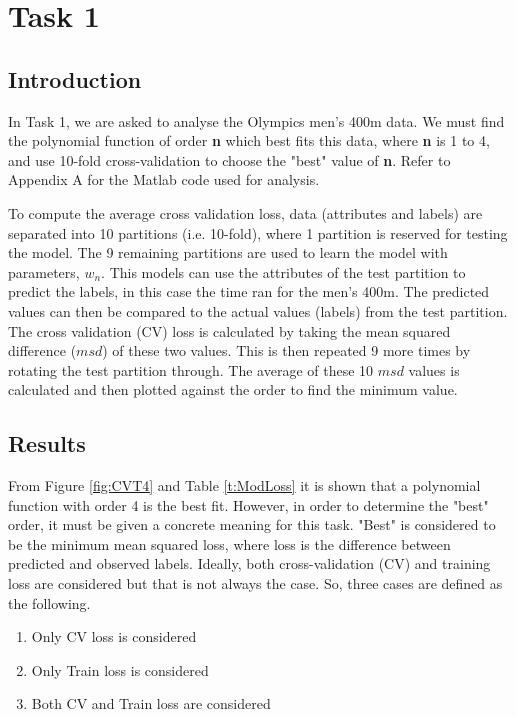 \section{Task 1}{\label{s1}
	
\subsection{Introduction}
In Task 1, we are asked to analyse the Olympics men's 400m data. We must find the polynomial function of order \textbf{n} which best fits this data, where \textbf{n} is 1 to 4, and use 10-fold cross-validation to choose the "best" value of \textbf{n}. Refer to Appendix A for the Matlab code used for analysis.

To compute the average cross validation loss, data (attributes and labels) are separated into 10 partitions (i.e. 10-fold), where 1 partition is reserved for testing the model. The 9 remaining partitions are used to learn the model with parameters, $w_{n}$. This models can use the attributes of the test partition to predict the labels, in this case the time ran for the men's 400m. The predicted values can then be compared to the actual values (labels)  from the test partition. The cross validation (CV) loss is calculated by taking the mean squared difference ($msd$) of these two values. This is then repeated 9 more times by rotating the test partition through. The average of these 10 $msd$ values is calculated and then plotted against the order to find the minimum value.
\subsection{Results}\label{CVcons}
From Figure \ref{fig:CVT4} and Table \ref{t:ModLoss} it is shown that a polynomial function with order 4 is the best fit. However, in order to determine the "best" order, it must be given a concrete meaning for this task. "Best" is considered to be the minimum mean squared loss, where loss is the difference between predicted and observed labels. Ideally, both cross-validation (CV) and training loss are considered but that is not always the case. So, three cases are defined as the following.

\begin{enumerate}
	\item Only CV loss is considered
	\item Only Train loss is considered
	\item Both CV and Train loss are considered
\end{enumerate}

}
